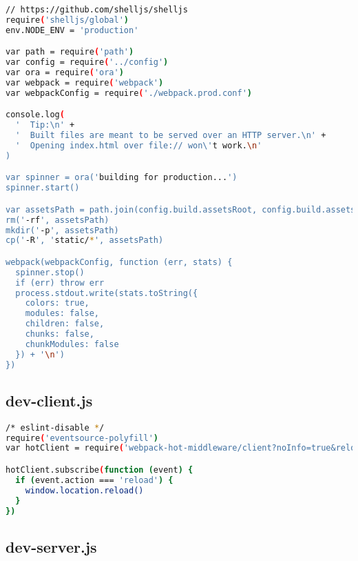 \begin{lstlisting}[language=bash]
// https://github.com/shelljs/shelljs
require('shelljs/global')
env.NODE_ENV = 'production'

var path = require('path')
var config = require('../config')
var ora = require('ora')
var webpack = require('webpack')
var webpackConfig = require('./webpack.prod.conf')

console.log(
  '  Tip:\n' +
  '  Built files are meant to be served over an HTTP server.\n' +
  '  Opening index.html over file:// won\'t work.\n'
)

var spinner = ora('building for production...')
spinner.start()

var assetsPath = path.join(config.build.assetsRoot, config.build.assetsSubDirectory)
rm('-rf', assetsPath)
mkdir('-p', assetsPath)
cp('-R', 'static/*', assetsPath)

webpack(webpackConfig, function (err, stats) {
  spinner.stop()
  if (err) throw err
  process.stdout.write(stats.toString({
    colors: true,
    modules: false,
    children: false,
    chunks: false,
    chunkModules: false
  }) + '\n')
})
\end{lstlisting}

\subsection{dev-client.js}


\begin{lstlisting}[language=bash]
/* eslint-disable */
require('eventsource-polyfill')
var hotClient = require('webpack-hot-middleware/client?noInfo=true&reload=true')

hotClient.subscribe(function (event) {
  if (event.action === 'reload') {
    window.location.reload()
  }
})
\end{lstlisting}


\subsection{dev-server.js}


